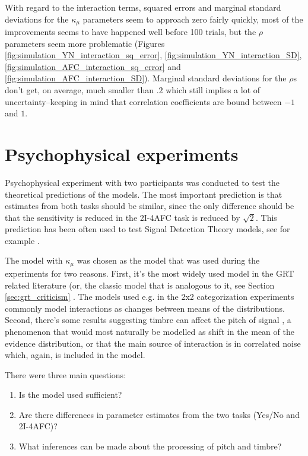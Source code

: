 \documentclass{article}\usepackage{knitr}
\begin{document}
With regard to the interaction terms, squared errors and marginal standard deviations for the $\kappa_{\mu}$ parameters seem to approach zero fairly quickly, most of the improvements seems to have happened well before 100 trials, but the $\rho$ parameters seem more problematic (Figures \ref{fig:simulation_YN_interaction_sq_error}, \ref{fig:simulation_YN_interaction_SD}, \ref{fig:simulation_AFC_interaction_sq_error} and \ref{fig:simulation_AFC_interaction_SD}). Marginal standard deviations for the $\rho$s don't get, on average, much smaller than $.2$ which still implies a lot of uncertainty--keeping in mind that correlation coefficients are bound between $-1$ and $1$.

\newpage


\section{Psychophysical experiments}
\label{sec:pp_exp}

Psychophysical experiment with two participants was conducted to test the theoretical predictions of the models.  The most important prediction is that estimates from both tasks should be similar, since the only difference should be that the sensitivity is reduced in the 2I-4AFC task is reduced by $\sqrt{2}$. This prediction has been often used to test Signal Detection Theory models, see for example \citet{wickens2002}.

The model with $\kappa_{\mu}$ was chosen as the model that was used during the experiments for two reasons. First, it's the most widely used model in the GRT related literature (or, the classic model that is analogous to it, see Section \ref{sec:grt_criticism} \textit{}. The models used e.g. in the 2x2 categorization experiments commonly model interactions as changes between means of the distributions. Second, there's some results suggesting timbre can affect the pitch of signal \citep{allen2014, platt1985}, a phenomenon that would most naturally be modelled as shift in the mean of the evidence distribution, or that the main source of interaction is in correlated noise \cite{silbert2009} which, again, is included in the model. 

There were three main questions: 

\begin{enumerate}
  \item Is the model used sufficient? 
  \item Are there differences in parameter estimates from the two tasks (Yes/No and 2I-4AFC)?
  \item What inferences can be made about the processing of pitch and timbre?
\end{enumerate}
 
\end{document}
